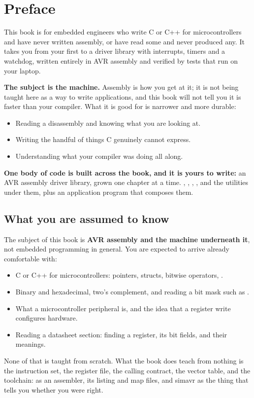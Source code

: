 
\chapter{Preface}

This book is for embedded engineers who write C or C++ for microcontrollers and have never
written assembly, or have read some and never produced any. It takes you from your first
 to a driver library with interrupts, timers and a watchdog, written entirely in AVR
assembly and verified by tests that run on your laptop.

\textbf{The subject is the machine.} Assembly is how you get at it; it is not being taught here as
a way to write applications, and this book will not tell you it is faster than your compiler.
What it is good for is narrower and more durable:
\begin{itemize}
  \item Reading a disassembly and knowing what you are looking at.
  \item Writing the handful of things C genuinely cannot express.
  \item Understanding what your compiler was doing all along.
\end{itemize}

\textbf{One body of code is built across the book, and it is yours to write:} an AVR assembly
driver library, grown one chapter at a time. , ,
, ,  and the utilities under them, plus an
application program that composes them.

\section*{What you are assumed to know}
The subject of this book is \textbf{AVR assembly and the machine underneath it}, not embedded
programming in general. You are expected to arrive already comfortable with:
\begin{itemize}
  \item C or C++ for microcontrollers: pointers, structs, bitwise operators, .
  \item Binary and hexadecimal, two's complement, and reading a bit mask such as .
  \item What a microcontroller peripheral is, and the idea that a register write configures
    hardware.
  \item Reading a datasheet section: finding a register, its bit fields, and their meanings.
\end{itemize}
None of that is taught from scratch. What the book does teach from nothing is the instruction set,
the register file, the calling contract, the vector table, and the toolchain:  as an
assembler, its listing and map files, and simavr as the thing that tells you whether you were
right.

